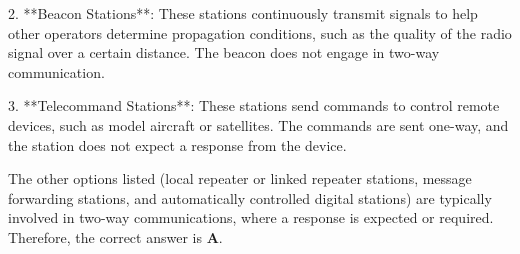 2. **Beacon Stations**: These stations continuously transmit signals to help other operators determine propagation conditions, such as the quality of the radio signal over a certain distance. The beacon does not engage in two-way communication.

3. **Telecommand Stations**: These stations send commands to control remote devices, such as model aircraft or satellites. The commands are sent one-way, and the station does not expect a response from the device.

The other options listed (local repeater or linked repeater stations, message forwarding stations, and automatically controlled digital stations) are typically involved in two-way communications, where a response is expected or required. Therefore, the correct answer is \textbf{A}.


